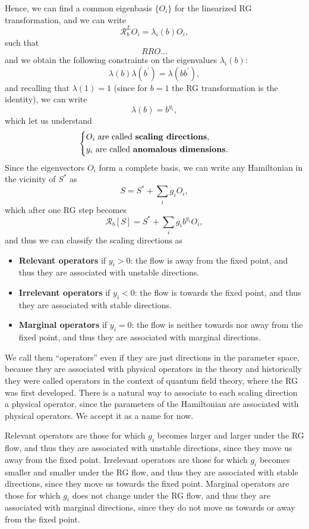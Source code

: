 Hence, we can find a common eigenbasis \(\{O_i\}\)  for the linearized RG transformation, and we can write
\[
    \mathcal{R}_b^L O_i = \lambda_i(b) O_i,
\]
such that
\[
    RRO \dots
\]
and we obtain the following constraints on the eigenvalues \(\lambda_i(b)\):
\[
    \lambda(b)\lambda(b^{\prime}) = \lambda(bb^{\prime}),
\]
and recalling that \(\lambda(1) = 1\) (since for \(b=1\) the RG transformation is the identity), we can write
\[
    \lambda(b) = b^{y_i},
\]
which let us understand
\[
    \begin{dcases}
        O_i \text{ are called \textbf{scaling directions},} \\
        y_i \text{ are called \textbf{anomalous dimensions}.}
    \end{dcases}
\]
Since the eigenvectors \(O_i\) form a complete basis, we can write any Hamiltonian in the vicinity of \(S^*\) as
\[
    S = S^* + \sum_{i} g_i O_i,
\]
which after one RG step becomes
\[
    \mathcal{R}_b[S] = S^* + \sum_{i} g_i b^{y_i} O_i,
\]
and thus we can classify the scaling directions as
\begin{itemize}
    \item \textbf{Relevant operators} if \(y_i > 0\): the flow is away from the fixed point, and thus they are associated with unstable directions.
    \item \textbf{Irrelevant operators} if \(y_i < 0\): the flow is towards the fixed point, and thus they are associated with stable directions.
    \item \textbf{Marginal operators} if \(y_i = 0\): the flow is neither towards nor away from the fixed point, and thus they are associated with marginal directions.
\end{itemize}
We call them ``operators'' even if they are just directions in the parameter space, because they are associated with physical operators in the theory and historically they were called operators in the context of quantum field theory, where the RG was first developed. There is a natural way to associate to each scaling direction a physical operator, since the parameters of the Hamiltonian are associated with physical operators. We accept it as a name for now.

Relevant operators are those for which \(g_i\) becomes larger and larger under the RG flow, and thus they are associated with unstable directions, since they move us away from the fixed point. Irrelevant operators are those for which \(g_i\) becomes smaller and smaller under the RG flow, and thus they are associated with stable directions, since they move us towards the fixed point. Marginal operators are those for which \(g_i\) does not change under the RG flow, and thus they are associated with marginal directions, since they do not move us towards or away from the fixed point.

